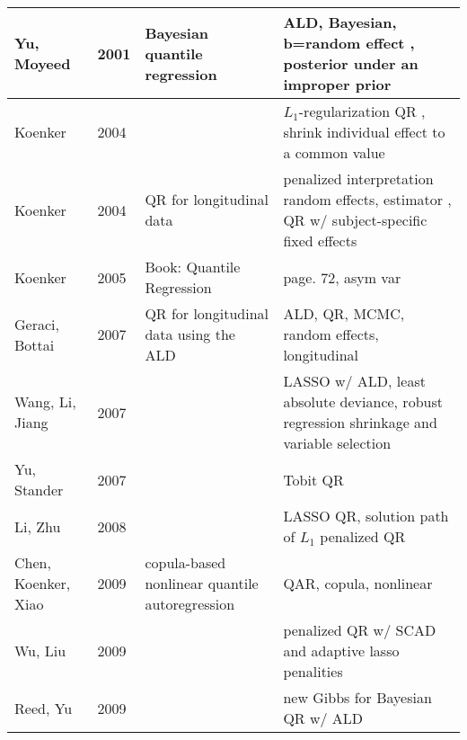 \documentclass{article}
\begin{document}
\begin{table}[htbp]
\begin{tabular}[tb]{m{4cm}|m{1cm}|m{5cm}|m{5cm}}
\hline
Yu, Moyeed                & 2001 & Bayesian quantile regression
                          & ALD, Bayesian, b=random effect , posterior
                          under an improper prior\\
\hline
Koenker                   & 2004 & 
                          & $L_1$-regularization QR , shrink individual effect to a common value
                                                                                                                                \\
\hline
Koenker                   & 2004 & QR for longitudinal data                     & penalized interpretation
random effects, estimator , QR w/ subject-specific fixed effects                                                                \\
\hline
Koenker                   & 2005 & Book: Quantile Regression                    & page. 72, asym var                            \\
\hline
Geraci, Bottai            & 2007 & QR for longitudinal data using the ALD       & ALD,
QR, MCMC, random effects, longitudinal                                                                                          \\
\hline
Wang, Li, Jiang           & 2007 &                                              & LASSO w/ ALD, least absolute deviance,
robust regression shrinkage and variable selection                                                                              \\
\hline
Yu, Stander               & 2007 &                                              & Tobit QR                                      \\
\hline
Li, Zhu                   & 2008 &                                              & LASSO QR, solution path of $L_1$ penalized QR \\
\hline
Chen, Koenker, Xiao       & 2009 & copula-based nonlinear quantile
autoregression            & QAR, copula, nonlinear                                                                              \\
\hline
Wu, Liu                   & 2009 &                                              & penalized QR w/ SCAD and adaptive lasso penalities
                                                                                                                                \\
\hline 
Reed, Yu                  & 2009 &                                              & new Gibbs for Bayesian QR w/ ALD              \\

\end{tabular}
\end{table}
\end{document}
